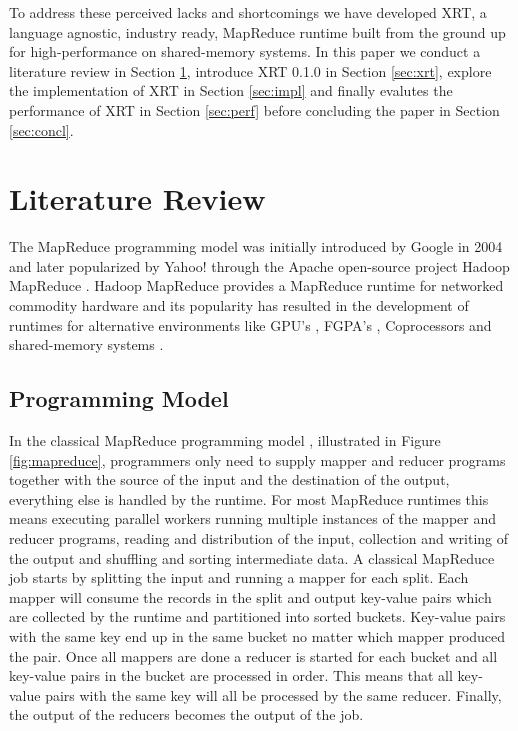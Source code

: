 \documentclass[twocolumn,11px]{article}       %
\begin{document}
To address these perceived lacks and shortcomings we have developed XRT, a language agnostic, industry ready, MapReduce runtime built from the ground up for high-performance on shared-memory systems.
In this paper we conduct a literature review in Section \ref{sec:litrev}, introduce XRT 0.1.0 in Section \ref{sec:xrt}, explore the implementation of XRT in Section \ref{sec:impl} and finally evalutes the performance of XRT in Section \ref{sec:perf} before concluding the paper in Section \ref{sec:concl}.



\section{Literature Review} \label{sec:litrev}

The MapReduce programming model was initially introduced by Google in 2004 \cite{GoogleMapReduce} and later popularized by Yahoo! through the Apache open-source project Hadoop MapReduce \cite{Hadoop}.
Hadoop MapReduce provides a MapReduce runtime for networked commodity hardware and its popularity has resulted in the development of runtimes for alternative environments like GPU’s \cite{Mars}, FGPA's \cite{Melia}, Coprocessors \cite{MrPhi} and shared-memory systems \cite{Phoenix} \cite{Phoenix++} \cite{CilkMR} \cite{Metis} \cite{Ostrich}.

\subsection{Programming Model}

In the classical MapReduce programming model \cite{GoogleMapReduce}, illustrated
in Figure \ref{fig:mapreduce}, programmers only need to supply mapper and
reducer programs together with the source of the input and the destination of
the output, everything else is handled by the runtime. For most MapReduce
runtimes this means executing parallel workers running multiple instances of the
mapper and reducer programs, reading and distribution of the input, collection
and writing of the output and shuffling and sorting intermediate data. A
classical MapReduce job starts by splitting the input and running a mapper for
each split. Each mapper will consume the records in the split and output
key-value pairs which are collected by the runtime and partitioned into sorted
buckets. Key-value pairs with the same key end up in the same bucket no matter
which mapper produced the pair. Once all mappers are done a reducer is started
for each bucket and all key-value pairs in the bucket are processed in order.
This means that all key-value pairs with the same key will all be processed by
the same reducer. Finally, the output of the reducers becomes the output of the
job.
\end{document}
